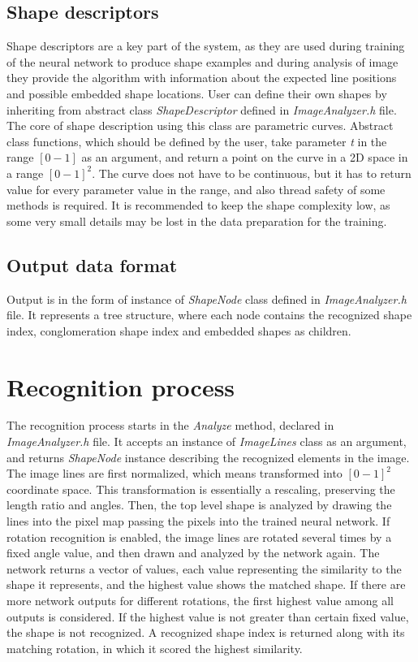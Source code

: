 \subsection{Shape descriptors}
Shape descriptors are a key part of the system, as they are used during training of the neural network to produce shape examples and during analysis of image they provide the algorithm with information about the expected line positions and possible embedded shape locations. User can define their own shapes by inheriting from abstract class \emph{ShapeDescriptor} defined in \emph{ImageAnalyzer.h} file. The core of shape description using this class are parametric curves. Abstract class functions, which should be defined by the user, take parameter \emph{t} in the range $[0-1]$ as an argument, and return a point on the curve in a 2D space in a range $[0-1]^2$. The curve does not have to be continuous, but it has to return value for every parameter value in the range, and also thread safety of some methods is required. It is recommended to keep the shape complexity low, as some very small details may be lost in the data preparation for the training. 

\subsection{Output data format}
Output is in the form of instance of \emph{ShapeNode} class defined in \emph{ImageAnalyzer.h} file. It represents a tree structure, where each node contains the recognized shape index, conglomeration shape index and embedded shapes as children.

\section{Recognition process}
The recognition process starts in the \emph{Analyze} method, declared in \emph{ImageAnalyzer.h} file. It accepts an instance of \emph{ImageLines} class as an argument, and returns \emph{ShapeNode} instance describing the recognized elements in the image. The image lines are first normalized, which means transformed into $[0-1]^2$ coordinate space. This transformation is essentially a rescaling, preserving the length ratio and angles. Then, the top level shape is analyzed by drawing the lines into the pixel map passing the pixels into the trained neural network. If rotation recognition is enabled, the image lines are rotated several times by a fixed angle value, and then drawn and analyzed by the network again. The network returns a vector of values, each value representing the similarity to the shape it represents, and the highest value shows the matched shape. If there are more network outputs for different rotations, the first highest value among all outputs is considered. If the highest value is not greater than certain fixed value, the shape is not recognized. A recognized shape index is returned along with its matching rotation, in which it scored the highest similarity.


